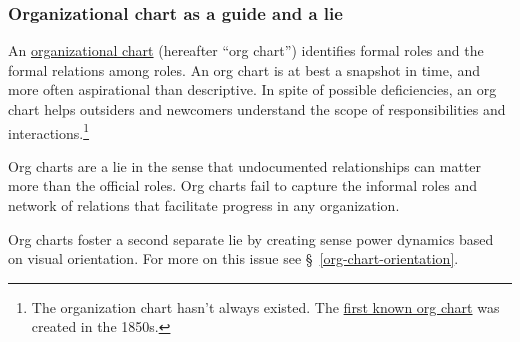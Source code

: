 \subsubsection*{Organizational chart as a guide and a lie}

An \href{https://en.wikipedia.org/wiki/Organizational_chart}{organizational chart} (hereafter ``org chart'') identifies formal roles and the formal relations among roles. An org chart is at best a snapshot in time, and more often aspirational than descriptive. In spite of possible deficiencies, an org chart helps outsiders and newcomers understand the scope of responsibilities and interactions.\footnote{The organization chart hasn't always existed. The \href{https://en.wikipedia.org/wiki/George_Holt_Henshaw\#First_organization_chart}{first known org chart} was created in the 1850s.}

Org charts are a lie in the sense that undocumented relationships can matter more than the official roles. Org charts fail to capture the informal roles and network of relations that facilitate progress in any organization. 

Org charts foster a second separate lie by creating sense power dynamics based on visual orientation. For more on this issue see \S~\ref{org-chart-orientation}.
